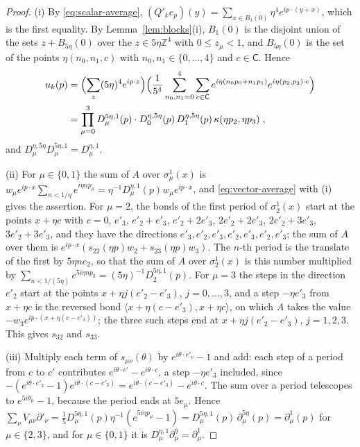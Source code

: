 \documentclass[11pt]{preprint}
\numberwithin{equation}{section}
\theoremstyle{definition}
\theoremstyle{remark}
\theoremstyle{plain}
\begin{document}
\begin{proof}
(i) By \eqref{eq:scalar-average}, $(Q'_ke_p)(y) = \sum_{x \in B_1(0)}\eta^4e^{ip \cdot (y + x)}$, which is the first equality. By Lemma~\ref{lem:blocks}(i), $B_1(0)$ is the disjoint union of the sets $z + B_{5\eta}(0)$ over the $z \in 5\eta\mathbb Z^4$ with $0 \leq z_\mu < 1$, and $B_{5\eta}(0)$ is the set of the points $\eta(n_0, n_1, c)$ with $n_0, n_1 \in \{ 0, \dots, 4 \}$ and $c \in \mathsf C$. Hence
\begin{equation}\label{eq:u-proof}
\begin{split}
    u_k(p) &= \Bigl(\sum_z(5\eta)^4e^{ip \cdot z}\Bigr)\Bigl(\frac{1}{5^4}\sum_{n_0,n_1=0}^{4}\sum_{c \in \mathsf C}e^{i\eta(n_0p_0 + n_1p_1)}e^{i\eta(p_2, p_3) \cdot c}\Bigr)\\
    &= \prod_{\mu=0}^{3}D^{5\eta,1}_\mu(p) \cdot D^{\eta,5\eta}_0(p)\,D^{\eta,5\eta}_1(p)\,\kappa(\eta p_2, \eta p_3)\;,
\end{split}
\end{equation}
and $D^{\eta,5\eta}_\mu D^{5\eta,1}_\mu = D^{\eta,1}_\mu$.

(ii) For $\mu \in \{ 0, 1 \}$ the sum of $A$ over $\sigma^1_\mu(x)$ is $w_\mu e^{ip \cdot x}\sum_{n<1/\eta}e^{i\eta np_\mu} = \eta^{-1}D^{\eta,1}_\mu(p)w_\mu e^{ip \cdot x}$, and \eqref{eq:vector-average} with (i) gives the assertion. For $\mu = 2$, the bonds of the first period of $\sigma^1_2(x)$ start at the points $x + \eta c$ with $c = 0$, $e'_3$, $e'_2 + e'_3$, $e'_2 + 2e'_3$, $2e'_2 + 2e'_3$, $2e'_2 + 3e'_3$, $3e'_2 + 3e'_3$, and they have the directions $e'_3, e'_2, e'_3, e'_2, e'_3, e'_2, e'_3$; the sum of $A$ over them is $e^{ip \cdot x}(s_{22}(\eta p)w_2 + s_{23}(\eta p)w_3)$. The $n$-th period is the translate of the first by $5\eta ne_2$, so that the sum of $A$ over $\sigma^1_2(x)$ is this number multiplied by $\sum_{n<1/(5\eta)}e^{5i\eta np_2} = (5\eta)^{-1}D^{5\eta,1}_2(p)$. For $\mu = 3$ the steps in the direction $e'_2$ start at the points $x + \eta j(e'_2 - e'_3)$, $j = 0, \dots, 3$, and a step $-\eta e'_3$ from $x + \eta c$ is the reversed bond $\langle x + \eta(c - e'_3), x + \eta c\rangle$, on which $A$ takes the value $-w_3e^{ip \cdot (x + \eta(c - e'_3))}$; the three such steps end at $x + \eta j(e'_2 - e'_3)$, $j = 1, 2, 3$. This gives $s_{32}$ and $s_{33}$.

(iii) Multiply each term of $s_{\mu\nu}(\theta)$ by $e^{i\theta \cdot e'_\nu} - 1$ and add: each step of a period from $c$ to $c'$ contributes $e^{i\theta \cdot c'} - e^{i\theta \cdot c}$, a step $-\eta e'_3$ included, since $-(e^{i\theta \cdot e'_3} - 1)e^{i\theta \cdot (c - e'_3)} = e^{i\theta \cdot (c - e'_3)} - e^{i\theta \cdot c}$. The sum over a period telescopes to $e^{5i\theta_\mu} - 1$, because the period ends at $5e_\mu$. Hence $\sum_\nu V_{\mu\nu}\partial'_\nu = \frac15D^{5\eta,1}_\mu(p)\eta^{-1}(e^{5i\eta p_\mu} - 1) = D^{5\eta,1}_\mu(p)\,\partial^{5\eta}_\mu(p) = \partial^1_\mu(p)$ for $\mu \in \{ 2, 3 \}$, and for $\mu \in \{ 0, 1 \}$ it is $D^{\eta,1}_\mu\partial^\eta_\mu = \partial^1_\mu$.


\end{proof}
\end{document}
